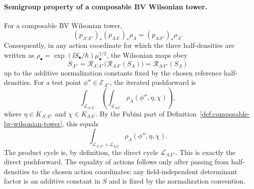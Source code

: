 \paragraph{Semigroup property of a composable BV Wilsonian tower.}
For a composable BV Wilsonian tower,
\[
  (p_{\Lambda'\Lambda''})_*
  (p_{\Lambda\Lambda'})_*\rho_\Lambda
  =
  (p_{\Lambda\Lambda''})_*\rho_\Lambda .
\]
Consequently, in any action coordinate for which the three half-densities are
written as
\(\rho_\bullet=\exp(\ii S_\bullet/\hbar)\mu_\bullet^{1/2}\), the Wilsonian
maps obey
\[
  S_{\Lambda''}
  =
  \mathcal R_{\Lambda'\Lambda''}
  \bigl(\mathcal R_{\Lambda\Lambda'}(S_\Lambda)\bigr)
  =
  \mathcal R_{\Lambda\Lambda''}(S_\Lambda)
\]
up to the additive normalization constants fixed by the chosen reference
half-densities.
For a test point \(\phi''\in\mathcal E_{\Lambda''}\), the iterated
pushforward is
\[
  \int_{\mathcal L_{\Lambda'\Lambda''}}
  \left(
  \int_{\mathcal L_{\Lambda\Lambda'}}
  \rho_\Lambda(\phi'',\eta,\chi)
  \right),
\]
where \(\eta\in K_{\Lambda'\Lambda''}\) and
\(\chi\in K_{\Lambda\Lambda'}\).  By the Fubini part of
Definition~\ref{def:composable-bv-wilsonian-tower}, this equals
\[
  \int_{\mathcal L_{\Lambda'\Lambda''}\times
        \mathcal L_{\Lambda\Lambda'}}
  \rho_\Lambda(\phi'',\eta,\chi).
\]
The product cycle is, by definition, the direct cycle
\(\mathcal L_{\Lambda\Lambda''}\).  This is exactly the direct pushforward.
The equality of actions follows only after passing from half-densities to the
chosen action coordinates; any field-independent determinant factor is an
additive constant in \(S\) and is fixed by the normalization convention.

